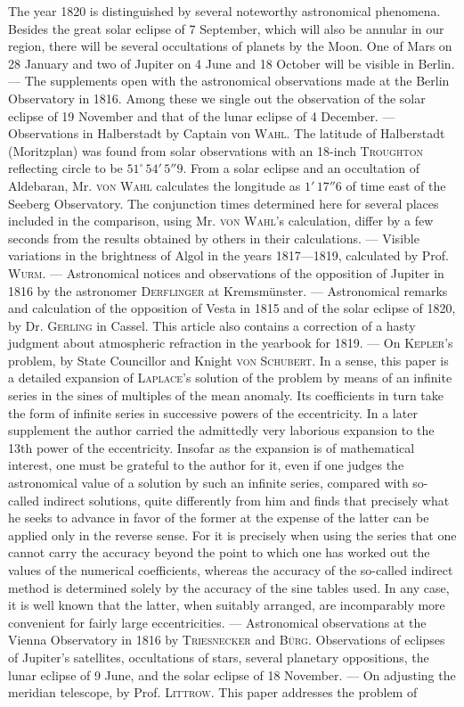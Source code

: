 The year 1820 is distinguished by several noteworthy astronomical phenomena. Besides the great solar eclipse of 7 September, which will also be annular in our region, there will be several occultations of planets by the Moon. One of Mars on 28 January and two of Jupiter on 4 June and 18 October will be visible in Berlin. --- The supplements open with the astronomical observations made at the Berlin Observatory in 1816. Among these we single out the observation of the solar eclipse of 19 November and that of the lunar eclipse of 4 December. --- Observations in Halberstadt by Captain von \textsc{Wahl}. The latitude of Halberstadt (Moritzplan) was found from solar observations with an 18-inch \textsc{Troughton} reflecting circle to be $51^\circ\,54'\,5''9$. From a solar eclipse and an occultation of Aldebaran, Mr. \textsc{von Wahl} calculates the longitude as $1'\,17''6$ of time east of the Seeberg Observatory. The conjunction times determined here for several places included in the comparison, using Mr. \textsc{von Wahl}'s calculation, differ by a few seconds from the results obtained by others in their calculations. --- Visible variations in the brightness of Algol in the years 1817---1819, calculated by Prof. \textsc{Wurm}. --- Astronomical notices and observations of the opposition of Jupiter in 1816 by the astronomer \textsc{Derflinger} at Kremsmünster. --- Astronomical remarks and calculation of the opposition of Vesta in 1815 and of the solar eclipse of 1820, by Dr. \textsc{Gerling} in Cassel. This article also contains a correction of a hasty judgment about atmospheric refraction in the yearbook for 1819. --- On \textsc{Kepler}'s problem, by State Councillor and Knight \textsc{von Schubert}. In a sense, this paper is a detailed expansion of \textsc{Laplace}'s solution of the problem by means of an infinite series in the sines of multiples of the mean anomaly. Its coefficients in turn take the form of infinite series in successive powers of the eccentricity. In a later supplement the author carried the admittedly very laborious expansion to the 13th power of the eccentricity. Insofar as the expansion is of mathematical interest, one must be grateful to the author for it, even if one judges the astronomical value of a solution by such an infinite series, compared with so-called indirect solutions, quite differently from him and finds that precisely what he seeks to advance in favor of the former at the expense of the latter can be applied only in the reverse sense. For it is precisely when using the series that one cannot carry the accuracy beyond the point to which one has worked out the values of the numerical coefficients, whereas the accuracy of the so-called indirect method is determined solely by the accuracy of the sine tables used. In any case, it is well known that the latter, when suitably arranged, are incomparably more convenient for fairly large eccentricities. --- Astronomical observations at the Vienna Observatory in 1816 by \textsc{Triesnecker} and \textsc{Bürg}. Observations of eclipses of Jupiter's satellites, occultations of stars, several planetary oppositions, the lunar eclipse of 9 June, and the solar eclipse of 18 November. --- On adjusting the meridian telescope, by Prof. \textsc{Littrow}. This paper addresses the problem of 